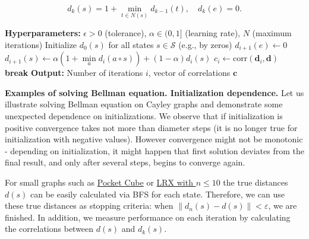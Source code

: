 \documentclass[reqno,11pt]{amsart}
\begin{document}

$$
d_k(s) = 1+\min_{t \in N(s)} d_{k-1}(t), \quad d_{k}(e) =0.
$$

\begin{algorithm}[H]
 \caption{Simple iteration (Dynamic programming)}
 \begin{algorithmic}[1]
 \STATE \textbf{Hyperparameters:} $\epsilon > 0$ (tolerance), $\alpha \in (0, 1]$ (learning rate), $N$ (maximum iterations)
 \STATE Initialize $d_0(s)$ for all states $s \in \mathcal S$ (e.g., by zeros)
 \STATE $d_{i+1}(e) \leftarrow 0$
 \STATE 
 $d_{i+1}(s) \leftarrow  \alpha(1 + \min\limits_a d_i(a\circ s)) + (1-\alpha)d_i(s)$
 \ENDFOR
 \STATE
 $c_i \leftarrow \mathrm{corr}(\boldsymbol d_i, \boldsymbol d)$
 \STATE \textbf{break}
 \ENDIF
 \ENDFOR
 \STATE \textbf{Output:} Number of iterations $i$, vector of correlations $\boldsymbol c$ 
 \end{algorithmic}
 \label{alg:DP}
 \end{algorithm}

{\bf Examples of solving Bellman equation. Initialization dependence.}
Let us illustrate solving Bellman equation on Cayley graphs and demonstrate some unexpected dependence on initializations.
We observe that if initialization is positive convergence takes not more than diameter steps (it is no longer true for initialization with negative values). However convergence might not be monotonic - depending on initialization, it might happen that first
solution deviates from the final result, and only after several steps, begins to converge again. 

For small graphs such as \href{https://www.kaggle.com/code/fedmug/bellman-rc2}{Pocket Cube} or \href{https://www.kaggle.com/code/fedmug/rl-dynamic-programming-on-small-lrx}{LRX with $n\leqslant 10$} the true distances $d(s)$ can be easily calculated via BFS for each state. Therefore, we can use these true distances as stopping criteria: when $\|d_n(s) - d(s)\| < \varepsilon$, we are finished. In addition, we measure performance on each iteration by calculating the correlations between $d(s)$ and $d_k(s)$.
\end{document}
